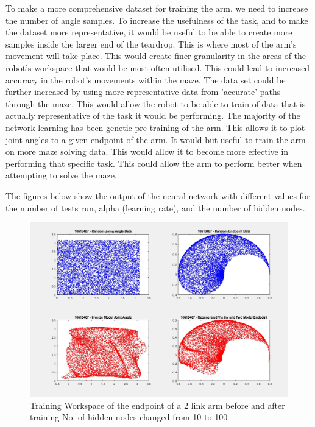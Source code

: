 \documentclass [11pt]{article}
\begin{document}
To make a more comprehensive dataset for training the arm, we need to increase the number of angle samples. To increase the usefulness of the task, and to make the dataset more representative, it would be useful to be able to create more samples inside the larger end of the teardrop. This is where most of the arm's movement will take place. This would create finer granularity in the areas of the robot's workspace that would be most often utilised. This could lead to increased accuracy in the robot's movements within the maze. The data set could be further increased by using more representative data from 'accurate' paths through the maze. This would allow the robot to be able to train of data that is actually representative of the task it would be performing. The majority of the network learning has been genetic pre training of the arm. This allows it to plot joint angles to a given endpoint of the arm. It would but useful to train the arm on more maze solving data. This would allow it to become more effective in performing that specific task. This could allow the arm to perform better when attempting to solve the maze.

The figures below show the output of the neural network with different values for the number of tests run, alpha (learning rate), and the number of hidden nodes. 

\begin{figure}[H]
\centerline{\includegraphics[width=15cm]{training_workspace_of_the_endpoint-of_a_2-link_arm_100_hidden_layers}}
\caption{Training Workspace of the endpoint of a 2 link arm before and after training No. of hidden nodes changed from 10 to 100}
\label{fig:nodes_10to_100}
\end{figure}
\end{document}

